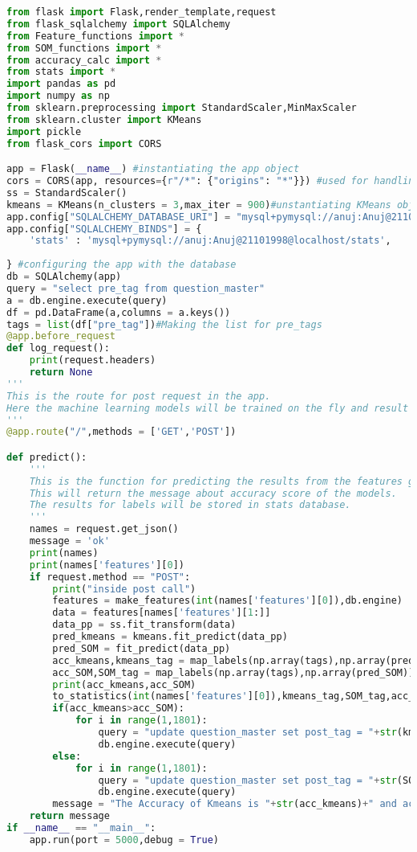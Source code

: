 \documentclass[a4paper,12pt,oneside]{book}
\begin{document}
\begin{lstlisting}[language= Python, caption= REST API]
from flask import Flask,render_template,request
from flask_sqlalchemy import SQLAlchemy 
from Feature_functions import *
from SOM_functions import *
from accuracy_calc import *
from stats import *
import pandas as pd 
import numpy as np 
from sklearn.preprocessing import StandardScaler,MinMaxScaler
from sklearn.cluster import KMeans
import pickle
from flask_cors import CORS

app = Flask(__name__) #instantiating the app object 
cors = CORS(app, resources={r"/*": {"origins": "*"}}) #used for handling calls from nodejs
ss = StandardScaler()
kmeans = KMeans(n_clusters = 3,max_iter = 900)#unstantiating KMeans object for clustering
app.config["SQLALCHEMY_DATABASE_URI"] = "mysql+pymysql://anuj:Anuj@21101998@localhost/auto_tagging_data"
app.config["SQLALCHEMY_BINDS"] = {
    'stats' : 'mysql+pymysql://anuj:Anuj@21101998@localhost/stats',
    
} #configuring the app with the database
db = SQLAlchemy(app)
query = "select pre_tag from question_master"
a = db.engine.execute(query)
df = pd.DataFrame(a,columns = a.keys())
tags = list(df["pre_tag"])#Making the list for pre_tags
@app.before_request
def log_request():
    print(request.headers)
    return None
'''
This is the route for post request in the app.
Here the machine learning models will be trained on the fly and result will be stored in database
'''
@app.route("/",methods = ['GET','POST'])

def predict():  
    '''
    This is the function for predicting the results from the features given throuh the form from node js.
    This will return the message about accuracy score of the models.
    The results for labels will be stored in stats database.
    '''
    names = request.get_json()
    message = 'ok'
    print(names)
    print(names['features'][0])
    if request.method == "POST":
        print("inside post call")
        features = make_features(int(names['features'][0]),db.engine)
        data = features[names['features'][1:]]
        data_pp = ss.fit_transform(data)
        pred_kmeans = kmeans.fit_predict(data_pp)
        pred_SOM = fit_predict(data_pp)
        acc_kmeans,kmeans_tag = map_labels(np.array(tags),np.array(pred_kmeans))
        acc_SOM,SOM_tag = map_labels(np.array(tags),np.array(pred_SOM))
        print(acc_kmeans,acc_SOM)
        to_statistics(int(names['features'][0]),kmeans_tag,SOM_tag,acc_kmeans,acc_SOM,tags,db.get_engine(app,"stats"))
        if(acc_kmeans>acc_SOM):
            for i in range(1,1801):
                query = "update question_master set post_tag = "+str(kmeans_tag[i-1])+" where id = "+str(i)
                db.engine.execute(query)
        else:
            for i in range(1,1801):
                query = "update question_master set post_tag = "+str(SOM_tag[i-1])+" where id = "+str(i)
                db.engine.execute(query)
        message = "The Accuracy of Kmeans is "+str(acc_kmeans)+" and accuracy of SOM is "+str(acc_SOM)
    return message
if __name__ == "__main__":
    app.run(port = 5000,debug = True)
\end{lstlisting}
\end{document}
